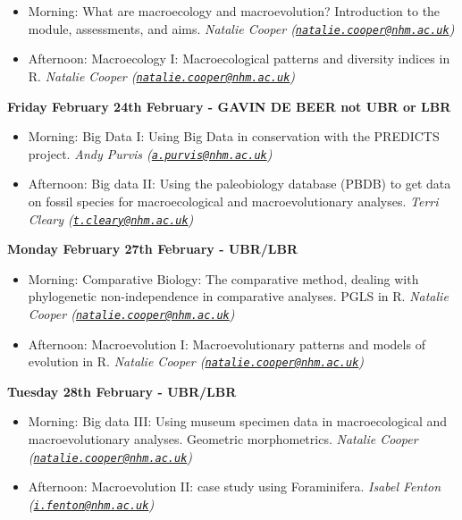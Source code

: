 \documentclass[]{book}
\begin{document}
\begin{itemize}
\item
  Morning: What are macroecology and macroevolution? Introduction to the
  module, assessments, and aims. \emph{Natalie Cooper
  (\href{mailto:natalie.cooper@nhm.ac.uk}{\nolinkurl{natalie.cooper@nhm.ac.uk}})}
\item
  Afternoon: Macroecology I: Macroecological patterns and diversity
  indices in R. \emph{Natalie Cooper
  (\href{mailto:natalie.cooper@nhm.ac.uk}{\nolinkurl{natalie.cooper@nhm.ac.uk}})}
\end{itemize}

\textbf{Friday February 24th February - GAVIN DE BEER not UBR or LBR}

\begin{itemize}
\item
  Morning: Big Data I: Using Big Data in conservation with the PREDICTS
  project. \emph{Andy Purvis
  (\href{mailto:a.purvis@nhm.ac.uk}{\nolinkurl{a.purvis@nhm.ac.uk}})}
\item
  Afternoon: Big data II: Using the paleobiology database (PBDB) to get
  data on fossil species for macroecological and macroevolutionary
  analyses. \emph{Terri Cleary
  (\href{mailto:t.cleary@nhm.ac.uk}{\nolinkurl{t.cleary@nhm.ac.uk}})}
\end{itemize}

\textbf{Monday February 27th February - UBR/LBR }

\begin{itemize}
\item
  Morning: Comparative Biology: The comparative method, dealing with
  phylogenetic non-independence in comparative analyses. PGLS in R.
  \emph{Natalie Cooper
  (\href{mailto:natalie.cooper@nhm.ac.uk}{\nolinkurl{natalie.cooper@nhm.ac.uk}})}
\item
  Afternoon: Macroevolution I: Macroevolutionary patterns and models of
  evolution in R. \emph{Natalie Cooper
  (\href{mailto:natalie.cooper@nhm.ac.uk}{\nolinkurl{natalie.cooper@nhm.ac.uk}})}
\end{itemize}

\textbf{Tuesday 28th February - UBR/LBR}

\begin{itemize}
\item
  Morning: Big data III: Using museum specimen data in macroecological
  and macroevolutionary analyses. Geometric morphometrics. \emph{Natalie
  Cooper
  (\href{mailto:natalie.cooper@nhm.ac.uk}{\nolinkurl{natalie.cooper@nhm.ac.uk}})}
\item
  Afternoon: Macroevolution II: case study using Foraminifera.
  \emph{Isabel Fenton
  (\href{mailto:i.fenton@nhm.ac.uk}{\nolinkurl{i.fenton@nhm.ac.uk}})}
\end{itemize}
\end{document}
